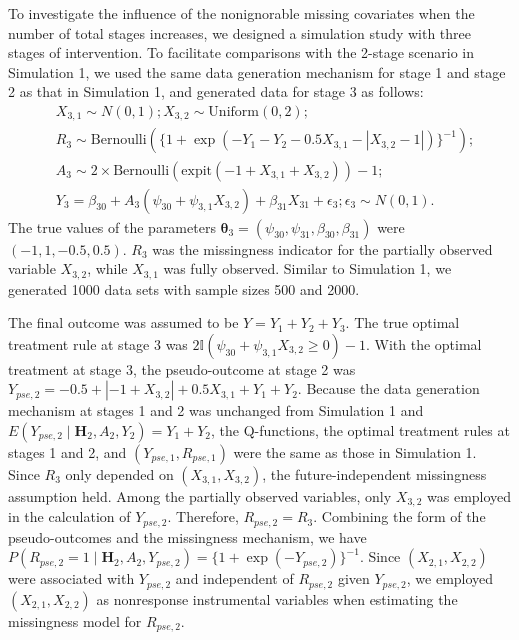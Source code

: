 \documentclass[12pt]{article}
\begin{document}
To investigate the influence of the nonignorable missing covariates when the number of total stages increases, we designed a simulation study with three stages of intervention. To facilitate comparisons with the 2-stage scenario in Simulation 1, we used the same data generation mechanism for stage 1 and stage 2 as that in Simulation 1, and generated data for stage 3 as follows:  
\begin{align*}
    &X_{3,1} \sim N(0,1); X_{3,2} \sim \text{Uniform}(0,2); \\
    &R_3  \sim \text{Bernoulli} (\{1+\exp(-Y_1-Y_2-0.5X_{3,1}-|X_{3,2}-1|)\}^{-1});\\
    &A_3 \sim 2\times \text{Bernoulli}(\text{expit}(-1+X_{3,1}+X_{3,2})) - 1;\\
    &Y_3 = \beta_{30}+A_3(\psi_{30}+\psi_{3,1}X_{3,2})+\beta_{31}X_{31} +\epsilon_3; \epsilon_3 \sim N(0,1).
\end{align*}
The true values of the parameters $\bm{\theta}_3 = (\psi_{30},\psi_{31},\beta_{30},\beta_{31})$ were $(-1,1,-0.5,0.5)$. $R_3$ was the missingness indicator for the partially observed variable $X_{3,2}$, while $X_{3,1}$ was fully observed. Similar to Simulation 1, we generated 1000 data sets with sample sizes 500 and 2000.  

The final outcome was assumed to be $Y=Y_1+Y_2+Y_3$. The true optimal treatment rule at stage 3 was $2\mathbb{I}(\psi_{30}+\psi_{3,1}X_{3,2} \geq 0)-1$. With the optimal treatment at stage 3, the pseudo-outcome at stage 2 was $Y_{pse,2}=-0.5+|-1+X_{3,2}|+0.5X_{3,1}+Y_1+Y_2$. Because the data generation mechanism at stages 1 and 2 was unchanged from Simulation 1 and $E(Y_{pse,2}\mid \bm{H}_2,A_2,Y_2) = Y_1+Y_2$, the Q-functions, the optimal treatment rules at stages 1 and 2, and $(Y_{pse,1},R_{pse,1})$ were the same as those in Simulation 1. Since $R_3$ only depended on $(X_{3,1},X_{3,2})$, the future-independent missingness assumption held. Among the partially observed variables, only $X_{3,2}$ was employed in the calculation of $Y_{pse,2}$. Therefore, $R_{pse,2} = R_3$. Combining the form of the pseudo-outcomes and the missingness mechanism, we have $P(R_{pse,2}=1\mid \bm{H}_2,A_2,Y_{pse,2}) = \{ 1+\exp(-Y_{pse,2})\}^{-1}$. Since $(X_{2,1},X_{2,2})$ were associated with $Y_{pse,2}$ and independent of $R_{pse,2}$ given $Y_{pse,2}$, we employed $(X_{2,1},X_{2,2})$ as nonresponse instrumental variables when estimating the missingness model for $R_{pse,2}$.  
\end{document}
